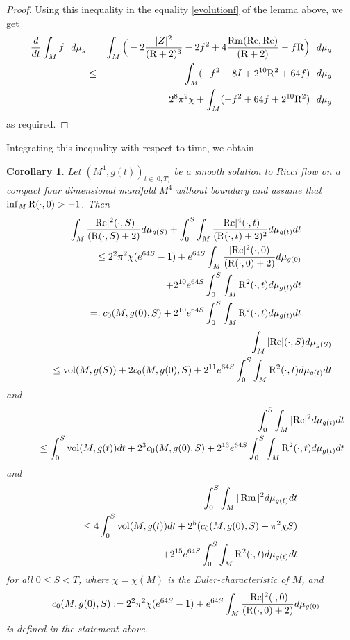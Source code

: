 \documentclass{amsart}
\numberwithin{equation}{section}
\newtheorem{coro}[theo]{Corollary}
\theoremstyle{definition}
\theoremstyle{remark}
\begin{document}
\begin{proof}
Using this inequality in the equality \eqref{evolutionf} of the lemma
above, we get
\begin{eqnarray*}
{\frac{d}{d t}} \int_M  f \ \ d\mu_g &=&\int_M \Big( -2\frac{|Z |^2}{({{\rm R}}+2)^3} 
 -2 f^2  +  4\frac {\operatorname{Rm}({{\rm{Rc}}},{{\rm{Rc}}})}{({{\rm R}}+2)}
- f {{\rm R}} \Big) \ \ d\mu_g \\
&\leq&\int_M ( -f^2 + 8 I +   2^{10} {{\rm R}}^2 + 64f) \ \ d\mu_g\cr
&=&2^8 \pi^2 \chi + \int_M ( -f^2 +   64 f + 2^{10} {{\rm R}}^2 )  \ \ d\mu_g
\end{eqnarray*}
as required.
\end{proof}

Integrating this inequality with respect to time, we obtain 
\begin{coro}\label{intestgen}
Let $(M^4,g(t))_{t\in [0,T)}$ be a smooth solution to Ricci flow  on a
compact four dimensional manifold $M^4$ without boundary and assume that $\inf_M
{{\rm R}}(\cdot,0) > -1$.  Then
\begin{eqnarray}
&& \int_M \frac{|{{\rm{Rc}}}|^2(\cdot,S)}{({{\rm R}}(\cdot,S) +2)} d\mu_{g(S)}  +
 \int_0^S  \int_M  \frac{|{{\rm{Rc}}}|^4(\cdot,t)}{({{\rm R}}(\cdot,t) +2)^2} d\mu_{g(t)} dt  \cr 
&& \ \ \ \ \leq 
2^2\pi^2 \chi(e^{64S} - 1) + e^{64S}\int_M
\frac{|{{\rm{Rc}}}|^2(\cdot,0)}{({{\rm R}}(\cdot,0) +2)} d\mu_{g(0)} \cr
&& \ \ \ \ \ \
+2^{10}e^{64S}\int_0^S \int_M {{\rm R}}^2(\cdot,t) d\mu_{g(t)} dt   \cr
&& =: c_0(M,g(0),S) + 2^{10}e^{64S}\int_0^S \int_M {{\rm R}}^2(\cdot,t) d\mu_{g(t)} dt \label{generalint1}
 \end{eqnarray}
\begin{eqnarray}
 &&\int_M |{{\rm{Rc}}}|(\cdot,S) d\mu_{g(S)} \cr
&& \ \ \ \ \leq  \operatorname{vol}(M,g(S)) + 2c_0(M,g(0),S)  + 2^{11}  e^{64S}\int_0^S \int_M {{\rm R}}^2(\cdot,t) d\mu_{g(t)} dt  \label{generalint2}
\end{eqnarray}
and
\begin{eqnarray}
&&\int_0^S \int_M |{{\rm{Rc}}}|^2  d\mu_{g(t)} dt \cr
&&\ \ \ \ \leq \int_0^S \operatorname{vol}(M,g(t)) dt 
+2^3c_0(M,g(0),S)
+ 2^{13} e^{64S}\int_0^S \int_M {{\rm R}}^2(\cdot,t) d\mu_{g(t)} dt
 \label{generalint3}
\end{eqnarray}
and
\begin{eqnarray}
&&\int_0^S \int_M |\operatorname{Rm}|^2  d\mu_{g(t)} dt \cr 
&& \ \  \
\leq 4\int_0^S \operatorname{vol}(M,g(t)) dt 
+ 2^5( c_0(M,g(0),S) + \pi^2 \chi S) \cr
&& \ \ \ \ +2^{15} e^{64S}\int_0^S \int_M {{\rm R}}^2(\cdot,t) d\mu_{g(t)} dt 
 \label{generalint4} 
\end{eqnarray}
for all $0\leq S <T$, where $\chi = \chi(M)$ is the
Euler-characteristic of $M$, and 
\begin{eqnarray}
&& c_0(M,g(0),S):= 2^2\pi^2 \chi(e^{64S} - 1) + e^{64S}\int_M
\frac{|{{\rm{Rc}}}|^2(\cdot,0)}{({{\rm R}}(\cdot,0) +2)} d\mu_{g(0)} 
\end{eqnarray}
is defined in the statement above.
\end{coro}
\end{document}
